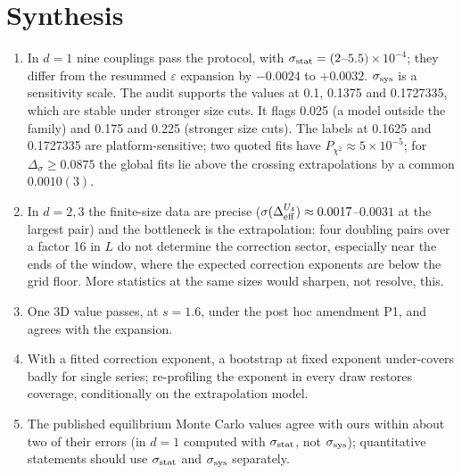 \documentclass[10pt,a4paper]{article}
\newcommand{\Ds}{\Delta_\sigma}
\newcommand{\Deff}{\Delta_{\rm eff}}
\newcommand{\sstat}{\sigma_{\rm stat}}
\newcommand{\ssys}{\sigma_{\rm sys}}
\begin{document}
\clearpage
\section{Synthesis}\label{sec:synthesis}
\begin{enumerate}[1.]
\item In $d=1$ nine couplings pass the protocol, with $\sstat=(2$--$5.5)\times10^{-4}$; they differ from the resummed $\varepsilon$ expansion
 by $-0.0024$ to $+0.0032$. $\ssys$ is a sensitivity scale. The audit supports the values at 0.1, 0.1375 and 0.1727335, which are stable under
 stronger size cuts. It flags 0.025 (a model outside the family) and 0.175 and 0.225 (stronger size cuts). The labels at 0.1625 and 0.1727335
 are platform-sensitive; two quoted fits have $P_{\chi^2}\approx5\times10^{-5}$; for $\Ds\ge0.0875$ the
 global fits lie above the crossing extrapolations by a common $0.0010(3)$.
\item In $d=2,3$ the finite-size data are precise ($\sigma(\Deff^{U_4})\approx0.0017$--$0.0031$ at the largest pair) and the bottleneck is the
 extrapolation: four doubling pairs over a factor 16 in $L$ do not determine the correction sector, especially near the ends of the window,
 where the expected correction exponents are below the grid floor. More statistics at the same sizes would sharpen, not resolve, this.
\item One 3D value passes, at $s=1.6$, under the post hoc amendment P1, and agrees with the expansion.
\item With a fitted correction exponent, a bootstrap at fixed exponent under-covers badly for single series; re-profiling the exponent in every
 draw restores coverage, conditionally on the extrapolation model.
\item The published equilibrium Monte Carlo values agree with ours within about two of their errors (in $d=1$ computed with $\sstat$, not
 $\ssys$); quantitative statements should use $\sstat$ and $\ssys$ separately.
\end{enumerate}

\end{document}
